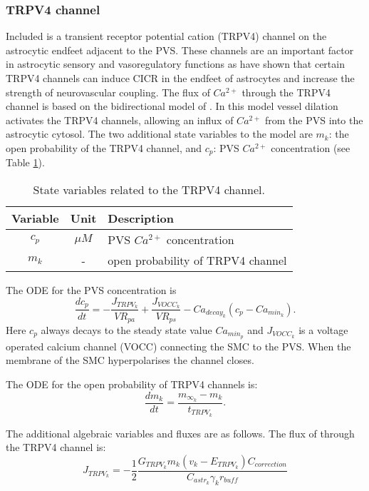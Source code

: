 	\subsubsection{TRPV4 channel}
	
	Included is a transient receptor potential cation (TRPV4) channel on the astrocytic endfeet adjacent to the PVS.
	These channels are an important factor in astrocytic sensory and vasoregulatory functions as \cite{Dunn2013} have shown that certain TRPV4 channels can induce CICR in the endfeet of astrocytes and increase the strength of neurovascular coupling.
	The flux of $Ca^{2+}$ through the TRPV4 channel is based on the bidirectional model of \cite{Witthoft2012}.
	In this model vessel dilation activates the TRPV4 channels, allowing an influx of $Ca^{2+}$ from the PVS into the astrocytic cytosol. 
	The two additional state variables to the model are
	$m_k$: the open probability of the TRPV4 channel, and $c_p$: PVS $Ca^{2+}$ concentration (see Table \ref{tab:NVU12trpv4}).
			
			\begin{table}[h!]
				\small
				\centering
					\begin{tabular}{c c l}
				\hline
				Variable & Unit & Description \\
				\hline
				$c_p$ &  $\mu M$ & PVS $Ca^{2+}$  concentration \\
				$m_k$ & - & open probability of TRPV4 channel \\
				\hline
					\end{tabular}
					\caption{State variables related to the TRPV4 channel.}
					\label{tab:NVU12trpv4}
			\end{table}
			
	The ODE for the PVS \ca concentration is
		\begin{equation}
		\frac{d c_p}{dt} = - \frac{J_{TRPV_k}}{VR_{pa}} + \frac{J_{VOCC_k}}{VR_{ps}} - Ca_{decay_k} ( c_p - Ca_{min_k} ).
		\end{equation}
	Here $c_p$ always decays to the steady state value $Ca_{min_p}$ and $J_{VOCC_k}$ is a voltage operated calcium channel (VOCC) connecting the SMC to the PVS. When the membrane of the SMC hyperpolarises the channel closes. 
	
	The ODE for the open probability of TRPV4 channels is:
		\begin{equation}
		\frac{d m_k}{dt} = \frac{m_{\infty_k} - m_k}{t_{TRPV_k}}.
		\end{equation}
	
	The additional algebraic variables and fluxes are as follows.	
	The flux of \ca through the TRPV4 channel is:
		\begin{equation}
		J_{TRPV_k} = -\frac{1}{2} \frac{ G_{TRPV_k} m_k (v_k - E_{TRPV_k}) C_{correction} }{C_{astr_k} \gamma_k r_{buff}}
		\end{equation}
	
